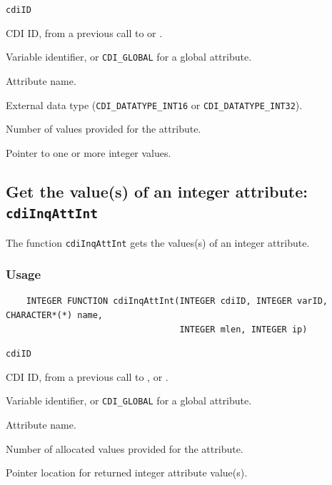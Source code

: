 \hspace*{4mm}\begin{minipage}[]{15cm}
\begin{deflist}{\texttt{cdiID}\ }
\item[\texttt{cdiID}]
CDI ID, from a previous call to {} or {}.
\item[\texttt{varID}]
Variable identifier, or {\texttt{CDI\_GLOBAL}} for a global attribute.
\item[\texttt{name}]
Attribute name.
\item[\texttt{type}]
External data type ({\texttt{CDI\_DATATYPE\_INT16}} or {\texttt{CDI\_DATATYPE\_INT32}}).
\item[\texttt{len}]
Number of values provided for the attribute.
\item[\texttt{ip}]
Pointer to one or more integer values.

\end{deflist}
\end{minipage}


\subsection{Get the value(s) of an integer attribute: \texttt{cdiInqAttInt}}
\label{cdiInqAttInt}

The function {\texttt{cdiInqAttInt}} gets the values(s) of an integer attribute.

\subsubsection*{Usage}

\begin{verbatim}
    INTEGER FUNCTION cdiInqAttInt(INTEGER cdiID, INTEGER varID, CHARACTER*(*) name, 
                                  INTEGER mlen, INTEGER ip)
\end{verbatim}

\hspace*{4mm}\begin{minipage}[]{15cm}
\begin{deflist}{\texttt{cdiID}\ }
\item[\texttt{cdiID}]
CDI ID, from a previous call to {}, {} or {}.
\item[\texttt{varID}]
Variable identifier, or {\texttt{CDI\_GLOBAL}} for a global attribute.
\item[\texttt{name}]
Attribute name.
\item[\texttt{mlen}]
Number of allocated values provided for the attribute.
\item[\texttt{ip}]
Pointer location for returned integer attribute value(s).

\end{deflist}
\end{minipage}


